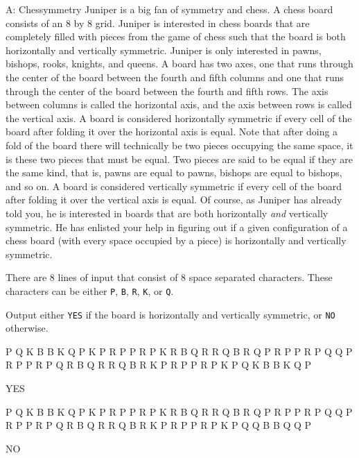 \begin{problem}{A: Chessymmetry} 
Juniper is a big fan of symmetry and chess.
A chess board consists of an 8 by 8 grid.
Juniper is interested in chess boards that are completely filled with pieces from the game of chess such that the board is both horizontally and vertically symmetric.
Juniper is only interested in pawns, bishops, rooks, knights, and queens.
A board has two axes, one that runs through the center of the board between the fourth and fifth columns and one that runs through the center of the board between the fourth and fifth rows.
The axis between columns is called the horizontal axis, and the axis between rows is called the vertical axis.
A board is considered horizontally symmetric if every cell of the board after folding it over the horizontal axis is equal.
Note that after doing a fold of the board there will technically be two pieces occupying the same space, it is these two pieces that must be equal.
Two pieces are said to be equal if they are the same kind, that is, pawns are equal to pawns, bishops are equal to bishops, and so on.
A board is considered vertically symmetric if every cell of the board after folding it over the vertical axis is equal.
Of course, as Juniper has already told you, he is interested in boards that are both horizontally \textit{and} vertically symmetric.
He has enlisted your help in figuring out if a given configuration of a chess board (with every space occupied by a piece) is horizontally and vertically symmetric.
\end{problem}

\begin{formalin}
There are 8 lines of input that consist of 8 space separated characters.
These characters can be either \texttt{P}, \texttt{B}, \texttt{R}, \texttt{K}, or \texttt{Q}.
\end{formalin}

\begin{formalout}
Output either \texttt{YES} if the board is horizontally and vertically symmetric, or \texttt{NO} otherwise. 
\end{formalout}

\begin{datain}
P Q K B B K Q P
K P R P P R P K
R B Q R R Q B R
Q P R P P R P Q
Q P R P P R P Q
R B Q R R Q B R
K P R P P R P K
P Q K B B K Q P
\end{datain}
\begin{dataout}
YES
\end{dataout}

\begin{datain}
P Q K B B K Q P
K P R P P R P K
R B Q R R Q B R
Q P R P P R P Q
Q P R P P R P Q
R B Q R R Q B R
K P R P P R P K
P Q Q B B Q Q P
\end{datain}
\begin{dataout}
NO
\end{dataout}
